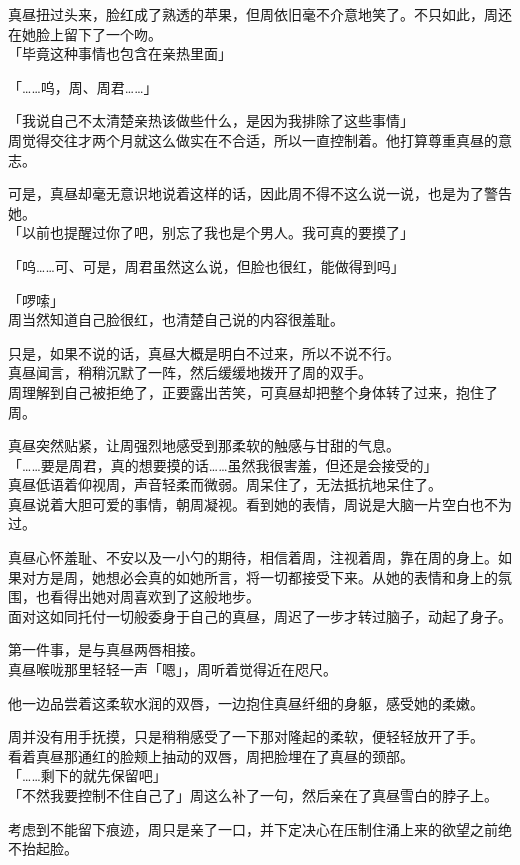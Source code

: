 真昼扭过头来，脸红成了熟透的苹果，但周依旧毫不介意地笑了。不只如此，周还在她脸上留下了一个吻。\\

「毕竟这种事情也包含在亲热里面」

「……呜，周、周君……」

「我说自己不太清楚亲热该做些什么，是因为我排除了这些事情」\\

周觉得交往才两个月就这么做实在不合适，所以一直控制着。他打算尊重真昼的意志。

可是，真昼却毫无意识地说着这样的话，因此周不得不这么说一说，也是为了警告她。\\

「以前也提醒过你了吧，别忘了我也是个男人。我可真的要摸了」

「呜……可、可是，周君虽然这么说，但脸也很红，能做得到吗」

「啰嗦」\\

周当然知道自己脸很红，也清楚自己说的内容很羞耻。

只是，如果不说的话，真昼大概是明白不过来，所以不说不行。\\

真昼闻言，稍稍沉默了一阵，然后缓缓地拨开了周的双手。\\

周理解到自己被拒绝了，正要露出苦笑，可真昼却把整个身体转了过来，抱住了周。

真昼突然贴紧，让周强烈地感受到那柔软的触感与甘甜的气息。\\

「……要是周君，真的想要摸的话……虽然我很害羞，但还是会接受的」\\

真昼低语着仰视周，声音轻柔而微弱。周呆住了，无法抵抗地呆住了。\\

真昼说着大胆可爱的事情，朝周凝视。看到她的表情，周说是大脑一片空白也不为过。

真昼心怀羞耻、不安以及一小勺的期待，相信着周，注视着周，靠在周的身上。如果对方是周，她想必会真的如她所言，将一切都接受下来。从她的表情和身上的氛围，也看得出她对周喜欢到了这般地步。\\

面对这如同托付一切般委身于自己的真昼，周迟了一步才转过脑子，动起了身子。

第一件事，是与真昼两唇相接。\\

真昼喉咙那里轻轻一声「嗯」，周听着觉得近在咫尺。

他一边品尝着这柔软水润的双唇，一边抱住真昼纤细的身躯，感受她的柔嫩。

周并没有用手抚摸，只是稍稍感受了一下那对隆起的柔软，便轻轻放开了手。\\

看着真昼那通红的脸颊上抽动的双唇，周把脸埋在了真昼的颈部。\\

「……剩下的就先保留吧」\\

「不然我要控制不住自己了」周这么补了一句，然后亲在了真昼雪白的脖子上。

考虑到不能留下痕迹，周只是亲了一口，并下定决心在压制住涌上来的欲望之前绝不抬起脸。
